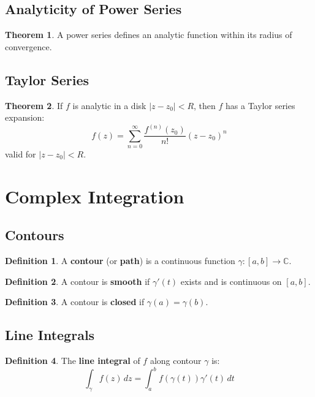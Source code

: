 \documentclass[11pt]{article}
\theoremstyle{definition}
\newtheorem{definition}{Definition}[section]
\newtheorem{theorem}{Theorem}[section]
\begin{document}
\subsection{Analyticity of Power Series}
\begin{theorem}
A power series defines an analytic function within its radius of convergence.
\end{theorem}

\subsection{Taylor Series}
\begin{theorem}
If $f$ is analytic in a disk $|z - z_0| < R$, then $f$ has a Taylor series expansion:
$$f(z) = \sum_{n=0}^{\infty} \frac{f^{(n)}(z_0)}{n!} (z - z_0)^n$$
valid for $|z - z_0| < R$.
\end{theorem}

\section{Complex Integration}

\subsection{Contours}
\begin{definition}
A \textbf{contour} (or \textbf{path}) is a continuous function $\gamma: [a,b] \to \mathbb{C}$.
\end{definition}

\begin{definition}
A contour is \textbf{smooth} if $\gamma'(t)$ exists and is continuous on $[a,b]$.
\end{definition}

\begin{definition}
A contour is \textbf{closed} if $\gamma(a) = \gamma(b)$.
\end{definition}

\subsection{Line Integrals}
\begin{definition}
The \textbf{line integral} of $f$ along contour $\gamma$ is:
$$\int_\gamma f(z) \, dz = \int_a^b f(\gamma(t)) \gamma'(t) \, dt$$
\end{definition}
\end{document}
